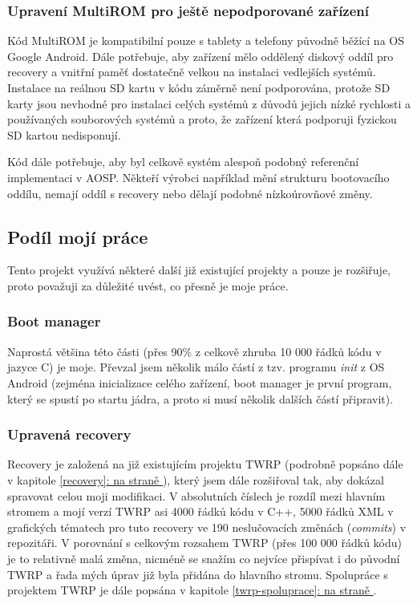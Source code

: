 \documentclass[12pt, a4paper, oneside]{article}
\newcommand{\It}{\textit}  %
\newcommand*{\fullref}[1]{\hyperref[{#1}]{\ref*{#1}: \uv{\nameref*{#1}} na straně \pageref{#1}}}
\begin{document}
\subsubsection{Upravení MultiROM pro ještě nepodporované zařízení}
Kód MultiROM je kompatibilní pouze s tablety a telefony původně běžící na OS Google Android. Dále potřebuje, aby zařízení mělo oddělený diskový oddíl pro recovery a vnitřní paměť dostatečně velkou na instalaci vedlejších systémů. Instalace na reálnou SD kartu v kódu záměrně není podporována, protože SD karty jsou nevhodné pro instalaci celých systémů z důvodů jejich nízké rychlosti a používaných souborových systémů a proto, že zařízení která podporuji fyzickou SD kartou nedisponují.

Kód dále potřebuje, aby byl celkově systém alespoň podobný referenční implementaci v AOSP. Někteří výrobci například mění strukturu bootovacího oddílu, nemají oddíl s recovery nebo dělají podobné nízkoúrovňové změny.

\subsection{Podíl mojí práce}
Tento projekt využívá některé další již existující projekty a pouze je rozšiřuje, proto považuji za důležité uvést, co přesně je moje práce.

\subsubsection{Boot manager}
Naprostá většina této části (přes 90\% z celkově zhruba 10 000 řádků kódu v jazyce C) je moje. Převzal jsem několik málo částí z tzv. programu \It{init} z OS Android (zejména inicializace celého zařízení, boot manager je první program, který se spustí po startu jádra, a proto si musí několik dalších částí připravit).

\subsubsection{Upravená recovery}
Recovery je založená na již existujícím projektu TWRP (podrobně popsáno dále v kapitole \fullref{recovery}), který jsem dále rozšiřoval tak, aby dokázal spravovat celou moji modifikaci. V absolutních číslech je rozdíl mezi hlavním stromem a mojí verzí TWRP asi 4000 řádků kódu  v C++, 5000 řádků XML v grafických tématech pro tuto recovery ve 190 neslučovacích změnách (\It{commits}) v repozitáři. V porovnání s celkovým rozsahem TWRP (přes 100 000 řádků kódu) je to relativně malá změna, nicméně se snažím co nejvíce přispívat i do původní TWRP a řada mých úprav již byla přidána do hlavního stromu. Spolupráce s projektem TWRP je dále popsána v kapitole \fullref{twrp-spoluprace}.
\end{document}
